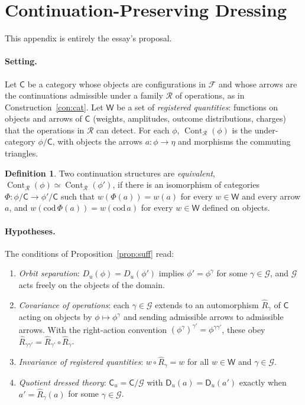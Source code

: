 \documentclass[11pt]{article}
\theoremstyle{plain}
\theoremstyle{definition}
\newtheorem{definition}{Definition}
\theoremstyle{remark}
\newcommand{\F}{\mathcal F}
\newcommand{\G}{\mathcal G}
\newcommand{\R}{\mathcal R}
\newcommand{\Cont}{\operatorname{Cont}}
\begin{document}
\section{Continuation-Preserving Dressing}\label{app:cont}

This appendix is entirely the essay's proposal.

\paragraph{Setting.} Let $\mathsf C$ be a category whose objects are configurations in $\F$ and whose arrows are the continuations admissible under a family $\R$ of operations, as in Construction~\ref{con:cat}. Let $\mathsf W$ be a set of \emph{registered quantities}: functions on objects and arrows of $\mathsf C$ (weights, amplitudes, outcome distributions, charges) that the operations in $\R$ can detect. For each $\phi$, $\Cont_\R(\phi)$ is the under-category $\phi/\mathsf C$, with objects the arrows $a:\phi\to\eta$ and morphisms the commuting triangles.

\begin{definition}
Two continuation structures are \emph{equivalent}, $\Cont_\R(\phi)\simeq\Cont_\R(\phi')$, if there is an isomorphism of categories $\Phi:\phi/\mathsf C\to\phi'/\mathsf C$ such that $w(\Phi(a))=w(a)$ for every $w\in\mathsf W$ and every arrow $a$, and $w(\mathrm{cod}\,\Phi(a))=w(\mathrm{cod}\,a)$ for every $w\in\mathsf W$ defined on objects.
\end{definition}

\paragraph{Hypotheses.} The conditions of Proposition~\ref{prop:suff} read:
\begin{enumerate}[label=(\alph*)]
\item \emph{Orbit separation}: $D_u(\phi)=D_u(\phi')$ implies $\phi'=\phi^\gamma$ for some $\gamma\in\G$, and $\G$ acts freely on the objects of the domain.
\item \emph{Covariance of operations}: each $\gamma\in\G$ extends to an automorphism $\widehat R_\gamma$ of $\mathsf C$ acting on objects by $\phi\mapsto\phi^\gamma$ and sending admissible arrows to admissible arrows. With the right-action convention $(\phi^\gamma)^{\gamma'}=\phi^{\gamma\gamma'}$, these obey $\widehat R_{\gamma\gamma'}=\widehat R_{\gamma'}\circ\widehat R_\gamma$.
\item \emph{Invariance of registered quantities}: $w\circ\widehat R_\gamma=w$ for all $w\in\mathsf W$ and $\gamma\in\G$.
\item \emph{Quotient dressed theory}: $\mathsf C_u=\mathsf C/\G$ with $\mathsf D_u(a)=\mathsf D_u(a')$ exactly when $a'=\widehat R_\gamma(a)$ for some $\gamma\in\G$.
\end{enumerate}
\end{document}
